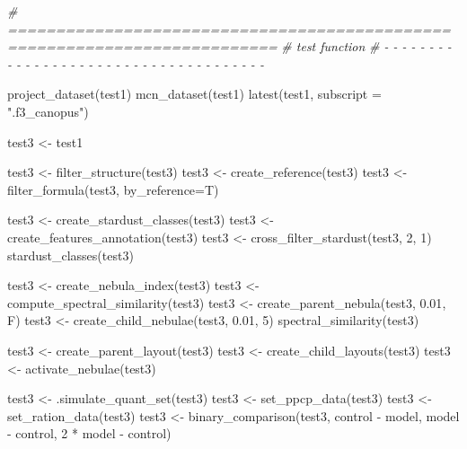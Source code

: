 \documentclass[
]{article}
\newenvironment{Shaded}{\begin{snugshade}}{\end{snugshade}}
\newcommand{\AttributeTok}[1]{\textcolor[rgb]{0.77,0.63,0.00}{#1}}
\newcommand{\CommentTok}[1]{\textcolor[rgb]{0.56,0.35,0.01}{\textit{#1}}}
\newcommand{\DecValTok}[1]{\textcolor[rgb]{0.00,0.00,0.81}{#1}}
\newcommand{\FloatTok}[1]{\textcolor[rgb]{0.00,0.00,0.81}{#1}}
\newcommand{\FunctionTok}[1]{\textcolor[rgb]{0.00,0.00,0.00}{#1}}
\newcommand{\NormalTok}[1]{#1}
\newcommand{\OtherTok}[1]{\textcolor[rgb]{0.56,0.35,0.01}{#1}}
\newcommand{\SpecialCharTok}[1]{\textcolor[rgb]{0.00,0.00,0.00}{#1}}
\newcommand{\StringTok}[1]{\textcolor[rgb]{0.31,0.60,0.02}{#1}}
\begin{document}
\begin{Shaded}
\begin{Highlighting}[]
\CommentTok{\# ==========================================================================}
\CommentTok{\# test function}
\CommentTok{\# {-} {-} {-} {-} {-} {-} {-} {-} {-} {-} {-} {-} {-} {-} {-} {-} {-} {-} {-} {-} {-} {-} {-} {-} {-} {-} {-} {-} {-} {-} {-} {-} {-} {-} {-} {-} {-}}

\FunctionTok{project\_dataset}\NormalTok{(test1)}
\FunctionTok{mcn\_dataset}\NormalTok{(test1)}
\FunctionTok{latest}\NormalTok{(test1, }\AttributeTok{subscript =} \StringTok{".f3\_canopus"}\NormalTok{)}

\NormalTok{test3 }\OtherTok{\textless{}{-}}\NormalTok{ test1}

\NormalTok{test3 }\OtherTok{\textless{}{-}} \FunctionTok{filter\_structure}\NormalTok{(test3)}
\NormalTok{test3 }\OtherTok{\textless{}{-}} \FunctionTok{create\_reference}\NormalTok{(test3)}
\NormalTok{test3 }\OtherTok{\textless{}{-}} \FunctionTok{filter\_formula}\NormalTok{(test3, }\AttributeTok{by\_reference=}\NormalTok{T)}

\NormalTok{test3 }\OtherTok{\textless{}{-}} \FunctionTok{create\_stardust\_classes}\NormalTok{(test3)}
\NormalTok{test3 }\OtherTok{\textless{}{-}} \FunctionTok{create\_features\_annotation}\NormalTok{(test3)}
\NormalTok{test3 }\OtherTok{\textless{}{-}} \FunctionTok{cross\_filter\_stardust}\NormalTok{(test3, }\DecValTok{2}\NormalTok{, }\DecValTok{1}\NormalTok{)}
\FunctionTok{stardust\_classes}\NormalTok{(test3)}

\NormalTok{test3 }\OtherTok{\textless{}{-}} \FunctionTok{create\_nebula\_index}\NormalTok{(test3)}
\NormalTok{test3 }\OtherTok{\textless{}{-}} \FunctionTok{compute\_spectral\_similarity}\NormalTok{(test3)}
\NormalTok{test3 }\OtherTok{\textless{}{-}} \FunctionTok{create\_parent\_nebula}\NormalTok{(test3, }\FloatTok{0.01}\NormalTok{, F)}
\NormalTok{test3 }\OtherTok{\textless{}{-}} \FunctionTok{create\_child\_nebulae}\NormalTok{(test3, }\FloatTok{0.01}\NormalTok{, }\DecValTok{5}\NormalTok{)}
\FunctionTok{spectral\_similarity}\NormalTok{(test3)}

\NormalTok{test3 }\OtherTok{\textless{}{-}} \FunctionTok{create\_parent\_layout}\NormalTok{(test3)}
\NormalTok{test3 }\OtherTok{\textless{}{-}} \FunctionTok{create\_child\_layouts}\NormalTok{(test3)}
\NormalTok{test3 }\OtherTok{\textless{}{-}} \FunctionTok{activate\_nebulae}\NormalTok{(test3)}

\NormalTok{test3 }\OtherTok{\textless{}{-}} \FunctionTok{.simulate\_quant\_set}\NormalTok{(test3)}
\NormalTok{test3 }\OtherTok{\textless{}{-}} \FunctionTok{set\_ppcp\_data}\NormalTok{(test3)}
\NormalTok{test3 }\OtherTok{\textless{}{-}} \FunctionTok{set\_ration\_data}\NormalTok{(test3)}
\NormalTok{test3 }\OtherTok{\textless{}{-}} \FunctionTok{binary\_comparison}\NormalTok{(test3, control }\SpecialCharTok{{-}}\NormalTok{ model,}
\NormalTok{                           model }\SpecialCharTok{{-}}\NormalTok{ control, }\DecValTok{2} \SpecialCharTok{*}\NormalTok{ model }\SpecialCharTok{{-}}\NormalTok{ control)}


\end{Highlighting}
\end{Shaded}
\end{document}
